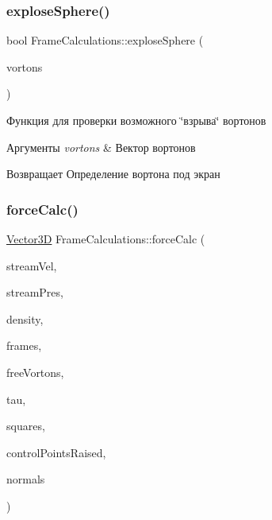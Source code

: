 \subsubsection{\texorpdfstring{explose\+Sphere()}{exploseSphere()}}
{\footnotesize\ttfamily bool Frame\+Calculations\+::explose\+Sphere (\begin{DoxyParamCaption}\item[{const Q\+Vector$<$ \mbox{\hyperlink{class_vorton}{Vorton}} $>$ \&}]{vortons }\end{DoxyParamCaption})\hspace{0.3cm}{\ttfamily [static]}}

Функция для проверки возможного \char`\"{}взрыва\char`\"{} вортонов 
\begin{DoxyParams}{Аргументы}
{\em vortons} & Вектор вортонов \\
\hline
\end{DoxyParams}
\begin{DoxyReturn}{Возвращает}
Определение вортона под экран 
\end{DoxyReturn}
\mbox{\label{class_frame_calculations_a136c7a54ad8afbf2fdcbb3fc797f3ba1}} 
\subsubsection{\texorpdfstring{force\+Calc()}{forceCalc()}}
{\footnotesize\ttfamily \mbox{\hyperlink{class_vector3_d}{Vector3D}} Frame\+Calculations\+::force\+Calc (\begin{DoxyParamCaption}\item[{const \mbox{\hyperlink{class_vector3_d}{Vector3D}}}]{stream\+Vel,  }\item[{double}]{stream\+Pres,  }\item[{double}]{density,  }\item[{Q\+Vector$<$ std\+::shared\+\_\+ptr$<$ \mbox{\hyperlink{class_multi_frame}{Multi\+Frame}} $>$$>$}]{frames,  }\item[{const Q\+Vector$<$ \mbox{\hyperlink{class_vorton}{Vorton}} $>$ \&}]{free\+Vortons,  }\item[{const double}]{tau,  }\item[{const Q\+Vector$<$ double $>$ \&}]{squares,  }\item[{const Q\+Vector$<$ \mbox{\hyperlink{class_vector3_d}{Vector3D}} $>$ \&}]{control\+Points\+Raised,  }\item[{const Q\+Vector$<$ \mbox{\hyperlink{class_vector3_d}{Vector3D}} $>$ \&}]{normals }\end{DoxyParamCaption})}

